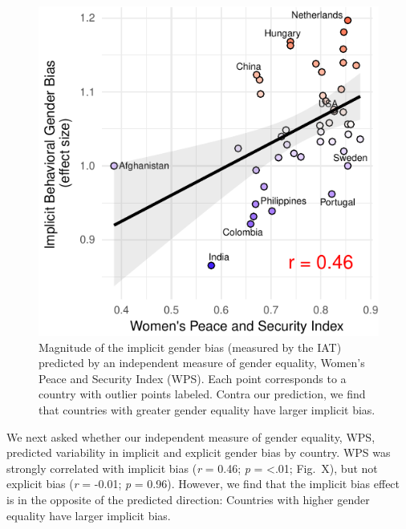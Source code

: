 \documentclass[10pt, letterpaper]{article}
\newenvironment{CodeChunk}{}{}
\begin{document}
\begin{CodeChunk}
\begin{figure}[t]

{\centering \includegraphics{figs/WPS_plot-1} 

}

\caption[Magnitude of the implicit gender bias (measured by the IAT) predicted by an independent measure of gender equality, Women's Peace and Security Index (WPS)]{Magnitude of the implicit gender bias (measured by the IAT) predicted by an independent measure of gender equality, Women's Peace and Security Index (WPS).  Each point corresponds to a country with outlier points labeled. Contra our prediction, we find that countries with greater gender equality have larger implicit bias.}\label{fig:WPS_plot}
\end{figure}
\end{CodeChunk}

We next asked whether our independent measure of gender equality, WPS,
predicted variability in implicit and explicit gender bias by country.
WPS was strongly correlated with implicit bias (\emph{r} = 0.46;
\emph{p} = \textless{}.01; Fig.~X), but not explicit bias (\emph{r} =
-0.01; \emph{p} = 0.96). However, we find that the implicit bias effect
is in the opposite of the predicted direction: Countries with higher
gender equality have larger implicit bias.
\end{document}
